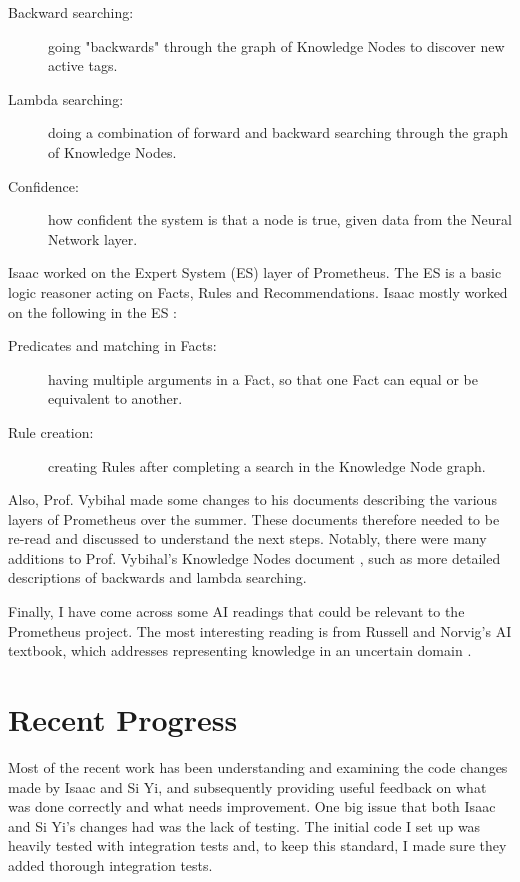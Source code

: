 \documentclass[]{article}
\begin{document}
	\begin{description}
		\item[Backward searching:] going "backwards" through the graph of Knowledge Nodes to discover new active tags.
		\item[Lambda searching:] doing a combination of forward and backward searching through the graph of Knowledge Nodes.
		\item[Confidence:] how confident the system is that a node is true, given data from the Neural Network layer.
	\end{description}

	Isaac worked on the Expert System (ES) layer of Prometheus. The ES is a basic logic reasoner acting on Facts, Rules and Recommendations. Isaac mostly worked on the following in the ES \cite{isaac}:
	
	\begin{description}
		\item[Predicates and matching in Facts:] having multiple arguments in a Fact, so that one Fact can equal or be equivalent to another.
		\item[Rule creation:] creating Rules after completing a search in the Knowledge Node graph.
	\end{description}
	

	Also, Prof. Vybihal made some changes to his documents describing the various layers of Prometheus over the summer. These documents therefore needed to be re-read and discussed to understand the next steps. Notably, there were many additions to Prof. Vybihal's Knowledge Nodes document \cite{vybihal-knowledge}, such as more detailed descriptions of backwards and lambda searching.
	
	Finally, I have come across some AI readings that could be relevant to the Prometheus project. The most interesting reading is from Russell and Norvig's AI textbook, which addresses representing knowledge in an uncertain domain \cite{russell2016artificial}.
	
	\section{Recent Progress} \label{progress}
	
	Most of the recent work has been understanding and examining the code changes made by Isaac and Si Yi, and subsequently providing useful feedback on what was done correctly and what needs improvement. One big issue that both Isaac and Si Yi's changes had was the lack of testing. The initial code I set up was heavily tested with integration tests and, to keep this standard, I made sure they added thorough integration tests.
	
\end{document}
